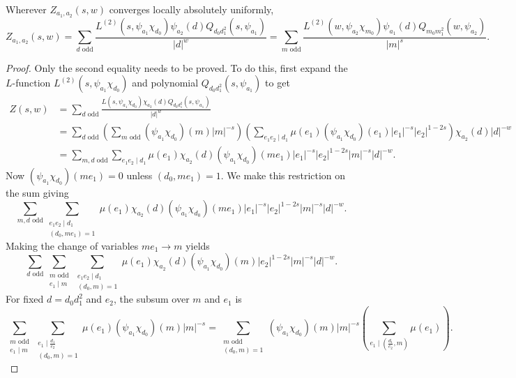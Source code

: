 \documentclass[12pt,reqno,oneside]{amsart}
\begin{document}
    \begin{theorem}[Interchange]
        Wherever $Z_{a_{1},a_{2}}(s,w)$ converges locally absolutely uniformly,
        \[
            Z_{a_{1},a_{2}}(s,w) = \sum_{\text{$d$ odd}}\frac{L^{(2)}(s,\psi_{a_{1}}\chi_{d_{0}})\psi_{a_{2}}(d)Q_{d_{0}d_{1}^{2}}(s,\psi_{a_{1}})}{|d|^{w}} = \sum_{\text{$m$ odd}}\frac{L^{(2)}(w,\psi_{a_{2}}\chi_{m_{0}})\psi_{a_{1}}(d)Q_{m_{0}m_{1}^{2}}(w,\psi_{a_{2}})}{|m|^{s}}.
        \]
    \end{theorem}
    \begin{proof}
        Only the second equality needs to be proved. To do this, first expand the $L$-function $L^{(2)}(s,\psi_{a_{1}}\chi_{d_{0}})$ and polynomial $Q_{d_{0}d_{1}^{2}}(s,\psi_{a_{1}})$ to get
        \begin{align*}
            Z(s,w) &= \sum_{\text{$d$ odd}}\frac{L(s,\psi_{a_{1}}\chi_{d_{0}})\chi_{a_{2}}(d)Q_{d_{0}d_{1}^{2}}(s,\psi_{a_{1}})}{|d|^{w}} \\
            &= \sum_{\text{$d$ odd}}\left(\sum_{\text{$m$ odd}}(\psi_{a_{1}}\chi_{d_{0}})(m)|m|^{-s}\right)\left(\sum_{e_{1}e_{2} \mid d_{1}}\mu(e_{1})(\psi_{a_{1}}\chi_{d_{0}})(e_{1})|e_{1}|^{-s}|e_{2}|^{1-2s}\right)\chi_{a_{2}}(d)|d|^{-w} \\
            &= \sum_{\text{$m,d$ odd}}\sum_{e_{1}e_{2} \mid d_{1}}\mu(e_{1})\chi_{a_{2}}(d)(\psi_{a_{1}}\chi_{d_{0}})(me_{1})|e_{1}|^{-s}|e_{2}|^{1-2s}|m|^{-s}|d|^{-w}.
        \end{align*}
        Now $(\psi_{a_{1}}\chi_{d_{0}})(me_{1}) = 0$ unless $(d_{0},me_{1}) = 1$. We make this restriction on the sum giving
        \[
            \sum_{\text{$m,d$ odd}}\sum_{\substack{e_{1}e_{2} \mid d_{1} \\ (d_{0},me_{1}) = 1}}\mu(e_{1})\chi_{a_{2}}(d)(\psi_{a_{1}}\chi_{d_{0}})(me_{1})|e_{1}|^{-s}|e_{2}|^{1-2s}|m|^{-s}|d|^{-w}.
        \]
        Making the change of variables $me_{1} \to m$ yields
        \[
            \sum_{\text{$d$ odd}}\sum_{\substack{\text{$m$ odd} \\ e_{1} \mid m}}\sum_{\substack{e_{1}e_{2} \mid d_{1} \\ (d_{0},m) = 1}}\mu(e_{1})\chi_{a_{2}}(d)(\psi_{a_{1}}\chi_{d_{0}})(m)|e_{2}|^{1-2s}|m|^{-s}|d|^{-w}.
        \]
        For fixed $d = d_{0}d_{1}^{2}$ and $e_{2}$, the subsum over $m$ and $e_{1}$ is
        \[
            \sum_{\substack{\text{$m$ odd} \\ e_{1} \mid m}}\sum_{\substack{e_{1} \mid \frac{d_{1}}{e_{2}} \\ (d_{0},m) = 1}}\mu(e_{1})(\psi_{a_{1}}\chi_{d_{0}})(m)|m|^{-s} = \sum_{\substack{\text{$m$ odd} \\ (d_{0},m) = 1}}(\psi_{a_{1}}\chi_{d_{0}})(m)|m|^{-s}\left(\sum_{e_{1} \mid \left(\frac{d_{1}}{e_{2}},m\right)}\mu(e_{1})\right).
\]
\end{proof}
\end{document}
